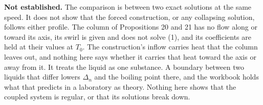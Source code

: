 \textbf{Not established.} The comparison is between two exact solutions at the same speed. It does
not show that the forced construction, or any collapsing solution, follows either profile. The
column of Propositions 20 and 21 has no flow along or toward its axis, its swirl is given and does
not solve (1), and its coefficients are held at their values at $T_0$. The construction's inflow
carries heat that the column leaves out, and nothing here says whether it carries that heat toward
the axis or away from it. It treats the
liquid as one substance. A boundary between two liquids that differ lowers $\Delta_n$ and the
boiling point there, and the workbook holds what that predicts in a laboratory as theory. Nothing
here shows that the coupled system is regular, or that its solutions break down.
